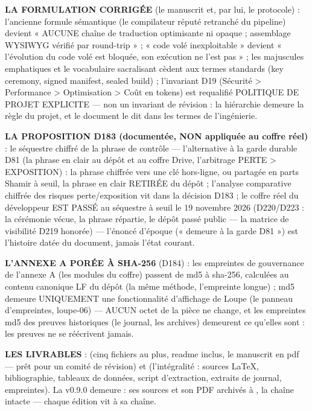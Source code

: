 \textbf{LA FORMULATION CORRIGÉE} (le manuscrit et, par lui, le protocole) :
l’ancienne formule sémantique (le compilateur réputé retranché du
pipeline) devient « AUCUNE chaîne de traduction
optimisante ni opaque ; assemblage WYSIWYG vérifié par round-trip » ;
« code volé inexploitable » devient « l'évolution du code volé est
bloquée, son exécution ne l'est pas » ; les majuscules emphatiques et le
vocabulaire sacralisant cèdent aux termes standards (key ceremony, signed
manifest, sealed build) ; l'invariant D19 (Sécurité > Performance >
Optimisation > Coût en tokens) est requalifié POLITIQUE DE PROJET
EXPLICITE — non un invariant de révision : la hiérarchie demeure la règle
du projet, et le document le dit dans les termes de l'ingénierie.

\textbf{LA PROPOSITION D183 (documentée, NON appliquée au coffre réel)} :
le séquestre chiffré de la phrase de contrôle — l'alternative à la garde
durable D81 (la phrase en clair au dépôt et au coffre Drive, l'arbitrage
PERTE > EXPOSITION) : la phrase chiffrée vers une clé hors-ligne, ou
partagée en parts Shamir à seuil, la phrase en clair RETIRÉE du dépôt ;
l'analyse comparative chiffrée des risques perte/exposition vit dans la
décision D183 ; le coffre réel du développeur EST PASSÉ au séquestre
à seuil le 19 novembre 2026 (D220/D223 : la cérémonie vécue, la
phrase répartie, le dépôt passé public — la matrice de visibilité
D219 honorée) — l'énoncé d'époque (« demeure à la garde D81 ») est
l'histoire datée du document, jamais l'état courant.

\textbf{L'ANNEXE A PORÉE À SHA-256} (D184) : les empreintes de gouvernance
de l'annexe A (les modules du coffre) passent de md5 à sha-256, calculées
au contenu canonique LF du dépôt (la même méthode, l'empreinte longue) ;
md5 demeure UNIQUEMENT une fonctionnalité d'affichage de Loupe (le panneau
d'empreintes, loupe-06) — AUCUN octet de la pièce ne change, et les
empreintes md5 des preuves historiques (le journal, les archives) demeurent
ce qu'elles sont : les preuves ne se réécrivent jamais.

\textbf{LES LIVRABLES} :  (cinq
fichiers au plus, readme inclus, le manuscrit en pdf — prêt pour un comité
de révision) et  (l'intégralité :
sources LaTeX, bibliographie, tableaux de données, script d'extraction,
extraits de journal, empreintes). La v0.9.0 demeure : ses sources et son
PDF archivés à , la chaîne  intacte — chaque
édition vit à sa chaîne.

